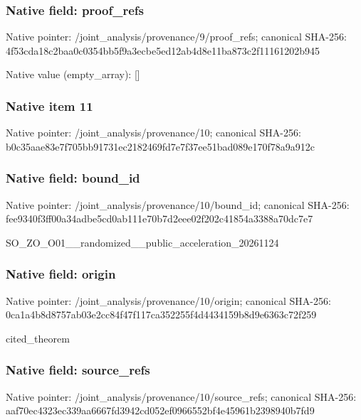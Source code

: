 \documentclass[10pt,a4paper]{article}
\begin{document}
\subsubsection{Native field: proof\_refs}


Native pointer: /joint\_analysis/provenance/9/proof\_refs; canonical SHA-256: 4f53cda18c2baa0c0354bb5f\allowbreak{}9a3ecbe5ed12ab4d8e11ba87\allowbreak{}3c2f11161202b945



Native value (empty\_array): []



\subsubsection{Native item 11}


Native pointer: /joint\_analysis/provenance/10; canonical SHA-256: b0c35aae83e7f705bb91731e\allowbreak{}c2182469fd7e7f37ee51bad0\allowbreak{}89e170f78a9a912c



\subsubsection{Native field: bound\_id}


Native pointer: /joint\_analysis/provenance/10/bound\_id; canonical SHA-256: fee9340f3ff00a34adbe5cd0\allowbreak{}ab111e70b7d2eee02f202c41\allowbreak{}854a3388a70dc7e7


SO\_ZO\_O01\_\_randomized\_\_p\allowbreak{}ublic\_acceleration\_20261\allowbreak{}124


\subsubsection{Native field: origin}


Native pointer: /joint\_analysis/provenance/10/origin; canonical SHA-256: 0ca1a4b8d8757ab03e2cc84f\allowbreak{}47f117ca352255f4d4434159\allowbreak{}b8d9e6363c72f259


cited\_theorem


\subsubsection{Native field: source\_refs}


Native pointer: /joint\_analysis/provenan\allowbreak{}ce/10/source\_refs; canonical SHA-256: aaf70ec4323ec339aa6667fd\allowbreak{}3942cd052ef0966552bf4e45\allowbreak{}961b2398940b7fd9
\end{document}
